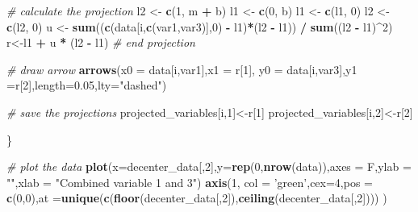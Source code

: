 \documentclass[
]{book}
\newenvironment{Shaded}{\begin{snugshade}}{\end{snugshade}}
\newcommand{\CommentTok}[1]{\textcolor[rgb]{0.56,0.35,0.01}{\textit{#1}}}
\newcommand{\DataTypeTok}[1]{\textcolor[rgb]{0.13,0.29,0.53}{#1}}
\newcommand{\DecValTok}[1]{\textcolor[rgb]{0.00,0.00,0.81}{#1}}
\newcommand{\FloatTok}[1]{\textcolor[rgb]{0.00,0.00,0.81}{#1}}
\newcommand{\KeywordTok}[1]{\textcolor[rgb]{0.13,0.29,0.53}{\textbf{#1}}}
\newcommand{\NormalTok}[1]{#1}
\newcommand{\OperatorTok}[1]{\textcolor[rgb]{0.81,0.36,0.00}{\textbf{#1}}}
\newcommand{\StringTok}[1]{\textcolor[rgb]{0.31,0.60,0.02}{#1}}
\theoremstyle{definition}
\theoremstyle{definition}
\theoremstyle{definition}
\theoremstyle{remark}
\begin{document}
\begin{Shaded}
\begin{Highlighting}[]
\CommentTok{# calculate the projection}
\NormalTok{l2 <-}\StringTok{ }\KeywordTok{c}\NormalTok{(}\DecValTok{1}\NormalTok{, m }\OperatorTok{+}\StringTok{ }\NormalTok{b)}
\NormalTok{l1 <-}\StringTok{ }\KeywordTok{c}\NormalTok{(}\DecValTok{0}\NormalTok{, b)}
\NormalTok{l1 <-}\StringTok{ }\KeywordTok{c}\NormalTok{(l1, }\DecValTok{0}\NormalTok{)}
\NormalTok{l2 <-}\StringTok{ }\KeywordTok{c}\NormalTok{(l2, }\DecValTok{0}\NormalTok{)}
\NormalTok{u <-}\StringTok{ }\KeywordTok{sum}\NormalTok{((}\KeywordTok{c}\NormalTok{(data[i,}\KeywordTok{c}\NormalTok{(var1,var3)],}\DecValTok{0}\NormalTok{) }\OperatorTok{-}\StringTok{ }\NormalTok{l1)}\OperatorTok{*}\NormalTok{(l2 }\OperatorTok{-}\StringTok{ }\NormalTok{l1)) }\OperatorTok{/}\StringTok{ }\KeywordTok{sum}\NormalTok{((l2 }\OperatorTok{-}\StringTok{ }\NormalTok{l1)}\OperatorTok{^}\DecValTok{2}\NormalTok{)}
\NormalTok{r<-l1 }\OperatorTok{+}\StringTok{ }\NormalTok{u }\OperatorTok{*}\StringTok{ }\NormalTok{(l2 }\OperatorTok{-}\StringTok{ }\NormalTok{l1)}
\CommentTok{# end projection}

\CommentTok{# draw arrow}
  \KeywordTok{arrows}\NormalTok{(}\DataTypeTok{x0 =}\NormalTok{ data[i,var1],}\DataTypeTok{x1 =}\NormalTok{ r[}\DecValTok{1}\NormalTok{],}
           \DataTypeTok{y0 =}\NormalTok{ data[i,var3],}\DataTypeTok{y1 =}\NormalTok{r[}\DecValTok{2}\NormalTok{],}\DataTypeTok{length=}\FloatTok{0.05}\NormalTok{,}\DataTypeTok{lty=}\StringTok{"dashed"}\NormalTok{)}


\CommentTok{# save the projections}
\NormalTok{projected_variables[i,}\DecValTok{1}\NormalTok{]<-r[}\DecValTok{1}\NormalTok{]}
\NormalTok{projected_variables[i,}\DecValTok{2}\NormalTok{]<-r[}\DecValTok{2}\NormalTok{]}

\NormalTok{\}}


\CommentTok{# plot the data}
\KeywordTok{plot}\NormalTok{(}\DataTypeTok{x=}\NormalTok{decenter_data[,}\DecValTok{2}\NormalTok{],}\DataTypeTok{y=}\KeywordTok{rep}\NormalTok{(}\DecValTok{0}\NormalTok{,}\KeywordTok{nrow}\NormalTok{(data)),}\DataTypeTok{axes =}\NormalTok{ F,}\DataTypeTok{ylab =} \StringTok{""}\NormalTok{,}\DataTypeTok{xlab =} \StringTok{"Combined variable 1 and 3"}\NormalTok{)}
\KeywordTok{axis}\NormalTok{(}\DecValTok{1}\NormalTok{, }\DataTypeTok{col =} \StringTok{'green'}\NormalTok{,}\DataTypeTok{cex=}\DecValTok{4}\NormalTok{,}\DataTypeTok{pos =} \KeywordTok{c}\NormalTok{(}\DecValTok{0}\NormalTok{,}\DecValTok{0}\NormalTok{),}\DataTypeTok{at =}\KeywordTok{unique}\NormalTok{(}\KeywordTok{c}\NormalTok{(}\KeywordTok{floor}\NormalTok{(decenter_data[,}\DecValTok{2}\NormalTok{]),}\KeywordTok{ceiling}\NormalTok{(decenter_data[,}\DecValTok{2}\NormalTok{]))) )}
\end{Highlighting}
\end{Shaded}
\end{document}
